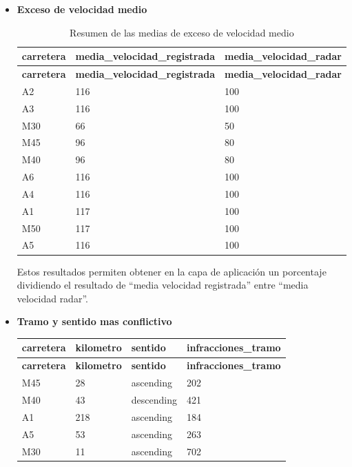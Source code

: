 \documentclass[]{article}
\begin{document}
\begin{itemize}
    \item \textbf{Exceso de velocidad medio}

\begin{table}[H]
\begin{longtable}{l l l}
    \hline
    \textbf{carretera} & \textbf{media\_velocidad\_registrada} & \textbf{media\_velocidad\_radar} \\ \hline
    \endfirsthead
    
    \hline
    \textbf{carretera} & \textbf{media\_velocidad\_registrada} & \textbf{media\_velocidad\_radar} \\ \hline
    \endhead
    
    A2 & 116 & 100 \\ \hline
    A3 & 116 & 100 \\ \hline
    M30 & 66 & 50 \\ \hline
    M45 & 96 & 80 \\ \hline
    M40 & 96 & 80 \\ \hline
    A6 & 116 & 100 \\ \hline
    A4 & 116 & 100 \\ \hline
    A1 & 117 & 100 \\ \hline
    M50 & 117 & 100 \\ \hline
    A5 & 116 & 100 \\ \hline
    
\end{longtable}
\caption{Resumen de las medias de exceso de velocidad medio}
\end{table}

Estos resultados permiten obtener en la capa de aplicación un porcentaje dividiendo el resultado de ``media velocidad registrada'' entre ``media velocidad radar''. 

    \item \textbf{Tramo y sentido mas conflictivo}

\begin{table}[H]
\begin{longtable}{l l l l}
    \hline
    \textbf{carretera} & \textbf{kilometro} & \textbf{sentido} & \textbf{infracciones\_tramo} \\ \hline
    \endfirsthead
    
    \hline
    \textbf{carretera} & \textbf{kilometro} & \textbf{sentido} & \textbf{infracciones\_tramo} \\ \hline
    \endhead
    
    M45 & 28 & ascending & 202 \\ \hline
    M40 & 43 & descending & 421 \\ \hline
    A1 & 218 & ascending & 184 \\ \hline
    A5 & 53 & ascending & 263 \\ \hline
    M30 & 11 & ascending & 702 \\ \hline
    

\end{longtable}
\end{table}
\end{itemize}
\end{document}
